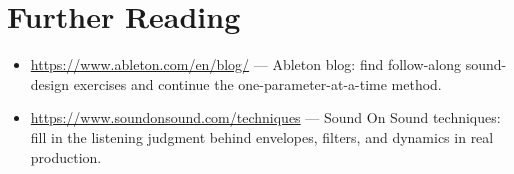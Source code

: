 \section*{Further Reading}
\begin{itemize}[leftmargin=1.5em]
\item \url{https://www.ableton.com/en/blog/} — Ableton blog: find follow-along sound-design exercises and continue the one-parameter-at-a-time method.
\item \url{https://www.soundonsound.com/techniques} — Sound On Sound techniques: fill in the listening judgment behind envelopes, filters, and dynamics in real production.
\end{itemize}

